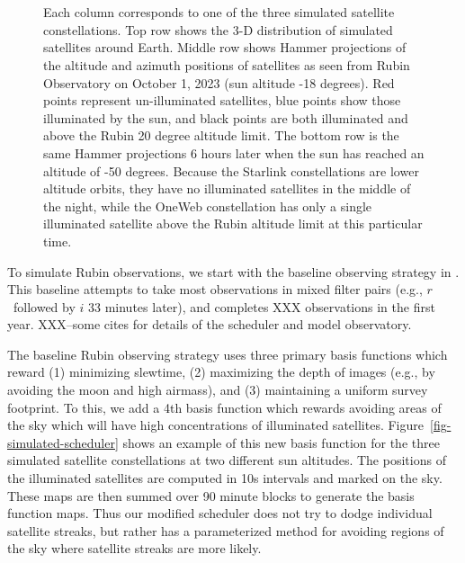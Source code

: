 \documentclass[linenumbers]{aastex631}
\begin{document}
\begin{figure}[ht!]
\\
\\
\caption{Each column corresponds to one of the three simulated satellite constellations. Top row shows the 3-D distribution of simulated satellites around Earth. Middle row shows Hammer projections of the altitude and azimuth positions of satellites as seen from Rubin Observatory on October 1, 2023 (sun altitude -18 degrees). Red points represent un-illuminated satellites, blue points show those illuminated by the sun, and black points are both illuminated and above the Rubin 20 degree altitude limit. The bottom row is the same Hammer  projections 6 hours later when the sun has reached an altitude of -50 degrees. Because the Starlink constellations are lower altitude orbits, they have no illuminated satellites in the middle of the night, while the OneWeb constellation has only a single illuminated satellite above the Rubin altitude limit at this particular time. \label{fig-simulated-constellations} }
\end{figure}

To simulate Rubin observations, we start with the baseline observing strategy in \citet{yoachim2022b}. This baseline attempts to take most observations in mixed filter pairs (e.g., $r$\ followed by $i$ 33 minutes later), and completes XXX observations in the first year. XXX--some cites for details of the scheduler and model observatory.

The baseline Rubin observing strategy uses three primary basis functions which reward (1) minimizing slewtime, (2) maximizing the depth of images (e.g., by avoiding the moon and high airmass), and (3) maintaining a uniform survey footprint. To this, we add a 4th basis function which rewards avoiding areas of the sky which will have high concentrations of illuminated satellites. Figure~\ref{fig-simulated-scheduler} shows an example of this new basis function for the three simulated satellite constellations at two different sun altitudes. The positions of the illuminated satellites are computed in 10s intervals and marked on the sky. These maps are then summed over 90 minute blocks to generate the basis function maps. Thus our modified scheduler does not try to dodge individual satellite streaks, but rather has a parameterized method for avoiding regions of the sky where satellite streaks are more likely.
\end{document}
